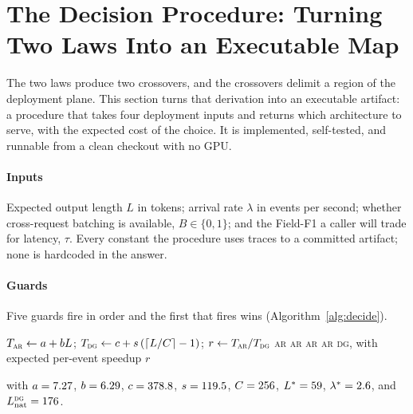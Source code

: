 \section{The Decision Procedure: Turning Two Laws Into an Executable Map}
\label{sec:decision}

The two laws produce two crossovers, and the crossovers delimit a region of
the deployment plane. This section turns that derivation into an executable
artifact: a procedure that takes four deployment inputs and returns which
architecture to serve, with the expected cost of the choice. It is
implemented, self-tested, and runnable from a clean checkout with no GPU.

\paragraph{Inputs}
Expected output length $L$ in tokens; arrival rate $\lambda$ in events per
second; whether cross-request batching is available, $B \in \{0,1\}$; and the
Field-F1 a caller will trade for latency, $\tau$. Every constant the procedure
uses traces to a committed artifact; none is hardcoded in the answer.

\paragraph{Guards}
Five guards fire in order and the first that fires wins
(Algorithm~\ref{alg:decide}).

\begin{algorithm}[H]
\caption{Decide which architecture to serve.}
\label{alg:decide}
\begin{algorithmic}[1]
\State $T_{\textsc{ar}} \gets a + bL$;\quad
       $T_{\textsc{dg}} \gets c + s\,(\lceil L/C\rceil - 1)$;\quad
       $r \gets T_{\textsc{ar}}/T_{\textsc{dg}}$
  \State \Return \textsc{ar}
  \State \Return \textsc{ar}
  \State \Return \textsc{ar}
  \State \Return \textsc{ar}
\Else
  \State \Return \textsc{dg}, with expected per-event speedup $r$
\EndIf
\end{algorithmic}
\end{algorithm}

\noindent
with $a = 7.27$, $b = 6.29$, $c = 378.8$, $s = 119.5$,
$C = 256$, $L^{*} = 59$, $\lambda^{*} =
2.6$, and $L^{\textsc{dg}}_{\mathrm{nat}} = 176$.


